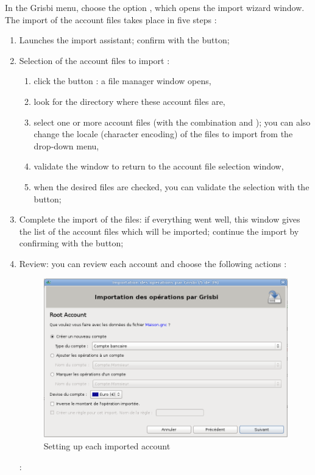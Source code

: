 
In the Grisbi  menu, choose the option  , which opens the import wizard window. The import of the account files takes place in five steps :

\begin{enumerate}
	\item Launches the import assistant; confirm with the  button;
	\item Selection of the account files to import :	
		\begin{enumerate}
			\item click the button  : a file manager window opens,	
			\item look for the directory where these account files are,
			\item select one or more account files (with the combination    and ); you can also change the \gls{locale} (\gls{character encoding}) of the files to import from the  drop-down menu,
			\item validate the window to return to the account file selection window,
			\item when the desired files are checked, you can validate the selection with the  button;
		\end{enumerate}		  
	\item Complete the import of the files: if everything went well, this window gives the list of the account files which will be imported; continue the import by confirming with the  button;
	\item Review: you can review each account and choose the following actions \ifIllustration {} :
	\begin{figure}[htbp]
	\begin{center}
	\includegraphics[scale=0.5]{image/screenshot/QIF_import_files_setup}
	\end{center}
	\caption{Setting up each imported account}
	\label{QIF-import-files-setup-img}
	\end{figure}
	\else  :
	\fi
	

\end{enumerate}
